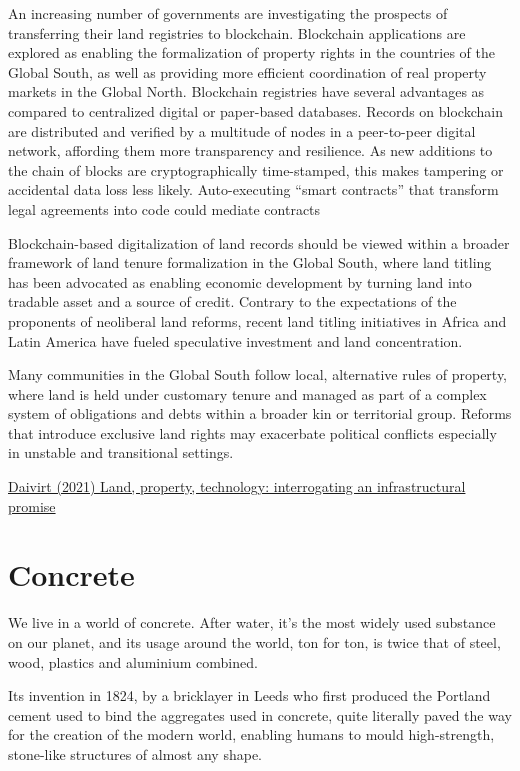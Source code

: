 \documentclass[
]{book}
\begin{document}
An increasing number of governments are investigating the prospects of transferring their land registries to blockchain.
Blockchain applications are explored as enabling the formalization of property rights in the countries of the Global South, as well as providing more efficient coordination of real property markets in the Global North. Blockchain registries have several advantages as compared to centralized digital or paper-based databases. Records on blockchain are distributed and verified by a multitude of nodes in a peer-to-peer digital network, affording them more transparency and resilience. As new additions to the chain of blocks are cryptographically time-stamped, this makes tampering or accidental data loss less likely. Auto-executing ``smart contracts'' that transform legal agreements into code could mediate contracts

Blockchain-based digitalization of land records should be viewed within a broader framework of land tenure formalization in the Global South, where land titling has been advocated as enabling economic development by turning land into tradable asset and a source of credit. Contrary to the expectations of the proponents of neoliberal land reforms, recent land titling initiatives in Africa and Latin America have fueled speculative investment and land concentration.

Many communities in the Global South follow local, alternative rules of property, where land is held under customary tenure and managed as part of a complex system of obligations and debts within a broader kin or territorial group. Reforms that introduce exclusive land rights may exacerbate political conflicts especially in unstable and transitional settings.

\href{https://developingeconomics.org/2021/05/20/land-property-technology-interrogating-an-infrastructural-promise/}{Daivirt (2021) Land, property, technology: interrogating an infrastructural promise}

\hypertarget{concrete}{%
\chapter{Concrete}\label{concrete}}

We live in a world of concrete. After water, it's the most widely used substance on our planet, and its usage around the world, ton for ton, is twice that of steel, wood, plastics and aluminium combined.

Its invention in 1824, by a bricklayer in Leeds who first produced the Portland cement used to bind the aggregates used in concrete, quite literally paved the way for the creation of the modern world, enabling humans to mould high-strength, stone-like structures of almost any shape.
\end{document}
